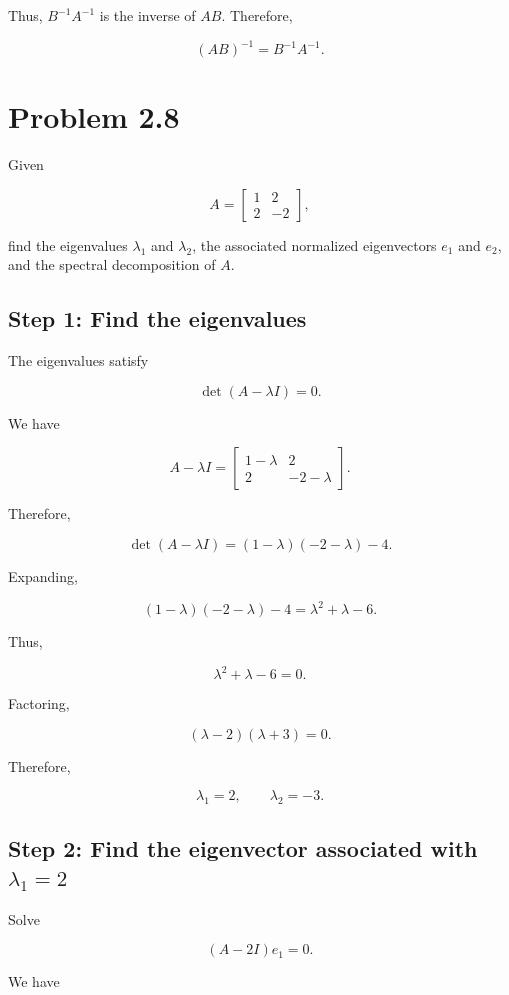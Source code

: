 \documentclass[12pt]{article}
\begin{document}
Thus, $B^{-1}A^{-1}$ is the inverse of $AB$. Therefore,

\[
\boxed{(AB)^{-1}=B^{-1}A^{-1}}.
\]


\section*{Problem 2.8}

Given

\[
A=
\begin{bmatrix}
1 & 2\\
2 & -2
\end{bmatrix},
\]

find the eigenvalues $\lambda_1$ and $\lambda_2$, the associated normalized eigenvectors $e_1$ and $e_2$, and the spectral decomposition of $A$.

\subsection*{Step 1: Find the eigenvalues}

The eigenvalues satisfy

\[
\det(A-\lambda I)=0.
\]

We have

\[
A-\lambda I
=
\begin{bmatrix}
1-\lambda & 2\\
2 & -2-\lambda
\end{bmatrix}.
\]

Therefore,

\[
\det(A-\lambda I)
=
(1-\lambda)(-2-\lambda)-4.
\]

Expanding,

\[
(1-\lambda)(-2-\lambda)-4
=
\lambda^2+\lambda-6.
\]

Thus,

\[
\lambda^2+\lambda-6=0.
\]

Factoring,

\[
(\lambda-2)(\lambda+3)=0.
\]

Therefore,

\[
\boxed{\lambda_1=2,\qquad \lambda_2=-3}.
\]

\subsection*{Step 2: Find the eigenvector associated with $\lambda_1=2$}

Solve

\[
(A-2I)e_1=0.
\]

We have
\end{document}
